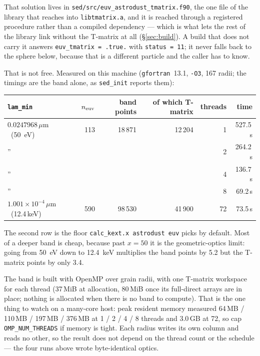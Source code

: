 \documentclass{my_memo}
\newcommand{\code}[1]{\texttt{#1}}
\newcommand{\um}{\ensuremath{\,\mu\mathrm{m}}}
\begin{document}
That solution lives in \code{sed/src/euv\_astrodust\_tmatrix.f90}, the one file
of the library that reaches into \code{libtmatrix.a}, and it is reached through
a registered procedure rather than a compiled dependency --- which is what lets
the rest of the library link without the T-matrix at all
(\S\ref{sec:build}). A build that does not carry it answers
\code{euv\_tmatrix = .true.} with \code{status = 11}; it never falls back to the
sphere below, because that is a different particle and the caller has to know.

That is not free. Measured on this machine (\code{gfortran}~13.1, \code{-O3},
167 radii; the timings are the band alone, as \code{sed\_init} reports them):

\begin{center}
\begin{tabular}{@{}lrrrrr@{}}
\toprule
\code{lam\_min} & $n_{\rm euv}$ & band points & of which T-matrix & threads & time \\
\midrule
$0.0247968$\um\ (\SI{50}{\electronvolt}) & 113 & 18\,871 & 12\,204 &  1 & 527.5\,s \\
\qquad''                                 &     &         &         &  2 & 264.2\,s \\
\qquad''                                 &     &         &         &  4 & 136.7\,s \\
\qquad''                                 &     &         &         &  8 &  69.2\,s \\
$1.001\times10^{-4}$\um\ (12.4\,keV)     & 590 & 98\,530 & 41\,900 & 72 &  73.5\,s \\
\bottomrule
\end{tabular}
\end{center}

\noindent The second row is the floor \code{calc\_kext.x astrodust euv} picks by
default. Most of a deeper band is cheap, because past $x = 50$ it is the
geometric-optics limit: going from \SI{50}{\electronvolt} down to
\SI{12.4}{\kilo\electronvolt} multiplies the band points by 5.2 but the T-matrix
points by only 3.4.

The band is built with OpenMP over grain radii, with one T-matrix workspace for
each thread (37\,MiB at allocation, 80\,MiB once its full-direct arrays are in
place; nothing is allocated when there is no band to compute). That is the one
thing to watch on a many-core host: peak resident memory measured
64\,MB / 110\,MB / 197\,MB / 376\,MB at 1 / 2 / 4 / 8 threads and 3.0\,GB at 72,
so cap \code{OMP\_NUM\_THREADS} if memory is tight. Each radius writes its own
column and reads no other, so the result does not depend on the thread count or
the schedule --- the four runs above wrote byte-identical optics.
\end{document}
